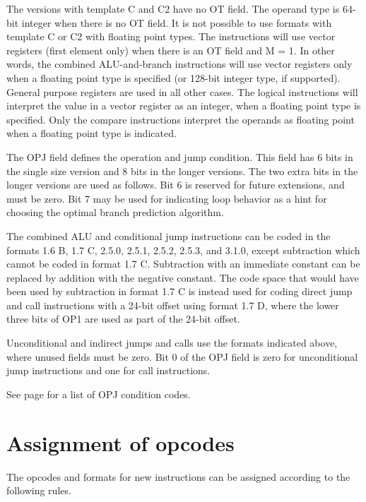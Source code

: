 \documentclass[forwardcom.tex]{subfiles}
\begin{document}
The versions with template C and C2 have no OT field. The operand type is 64-bit integer when there is no OT field. It is not possible to use formats with template C or C2 with floating point types. The instructions will use vector registers (first element only) when there is an OT field and M = 1. In other words, the combined ALU-and-branch instructions will use vector registers only when a floating point type is specified (or 128-bit integer type, if supported). General purpose registers are used in all other cases. The logical instructions will interpret the value in a vector register as an integer, when a floating point type is specified. Only the compare instructions interpret the operands as floating point when a floating point type is indicated.
\vspace{2mm}

The OPJ field defines the operation and jump condition. This field has 6 bits in the single size version and 8 bits in the longer versions. The two extra bits in the longer versions are used as follows. Bit 6 is reserved for future extensions, and must be zero. Bit 7 may be used for indicating loop behavior as a hint for choosing the optimal branch prediction algorithm.
\vspace{2mm}

The combined ALU and conditional jump instructions can be coded in the formats 1.6 B, 1.7 C, 2.5.0, 2.5.1, 2.5.2, 2.5.3, and 3.1.0, except subtraction which cannot be coded in format 1.7 C. Subtraction with an immediate constant can be replaced by addition with the negative constant. The code space that would have been used by subtraction in format 1.7 C is instead used for coding direct jump and call instructions with a 24-bit offset using format 1.7 D, where the lower three bits of OP1 are used as part of the 24-bit offset.
\vspace{2mm}

Unconditional and indirect jumps and calls use the formats indicated above, where unused fields must be zero. Bit 0 of the OPJ field is zero for unconditional jump instructions and one for call instructions.
\vspace{2mm}

See page \pageref{table:controlTransferInstructions} for a list of OPJ condition codes.
\vspace{2mm}


\section{Assignment of opcodes}
The opcodes and formats for new instructions can be assigned according to the following rules.
\end{document}
